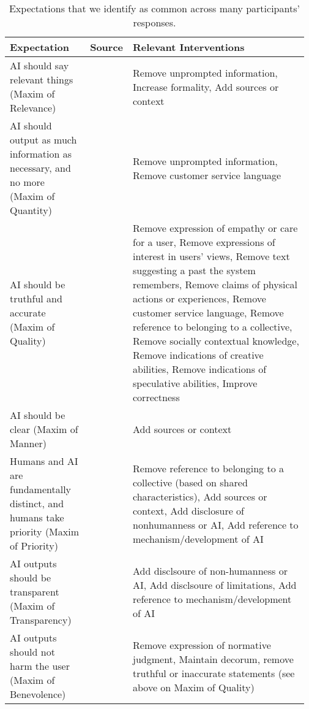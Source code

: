 \documentclass[11pt]{article}
\begin{document}
\begin{table*}[th!]\scriptsize
\begin{tabular}{@{}p{0.27\linewidth}|p{0.1\linewidth}|p{0.6\linewidth}@{}}\hline
 \textbf{Expectation}                                                                   & \textbf{Source} & \textbf{Relevant Interventions}                                                        \\   \hline
AI should say relevant things (Maxim of Relevance)                                     & \citet{grice1975logic}               & Remove unprompted information, Increase formality, Add sources or context \\\hline
AI should output as much information as necessary, and no more (Maxim of Quantity)     & \citet{grice1975logic}               & Remove unprompted information, Remove customer service language                            \\\hline
AI should be truthful and accurate (Maxim of Quality)                                  & \citet{grice1975logic}               & Remove expression of empathy or care for a user, Remove expressions of interest in users’ views, Remove text suggesting a past the system remembers, Remove claims of physical actions or experiences, Remove customer service language, Remove reference to belonging to a collective, Remove socially contextual knowledge, Remove indications of creative abilities, Remove indications of speculative abilities, Improve correctness                                                 \\\hline
AI should be clear (Maxim of Manner)                                                   & \citet{grice1975logic}               &     Add sources or context                                        \\\hline
Humans and AI are fundamentally distinct, and humans take priority (Maxim of Priority) & \citet{panfili2021human}             & Remove reference to belonging to a collective (based on shared characteristics), Add sources or context,  Add disclosure of nonhumanness or AI, Add reference to mechanism/development of AI             \\\hline
AI outputs should be transparent (Maxim of Transparency)                               & \citet{miehling-etal-2024-language}            & Add disclsoure of non-humanness or AI, Add disclsoure of limitations, Add reference to mechanism/development of AI       \\\hline
AI outputs should not harm the user (Maxim of Benevolence)                             & \citet{miehling-etal-2024-language}             & Remove expression of normative judgment, Maintain decorum, remove truthful or inaccurate statements (see above on Maxim of Quality)\\ \hline
\end{tabular}
\caption{Expectations that we identify as common across many participants' responses.}\label{tab:exp}
\end{table*}
\end{document}
